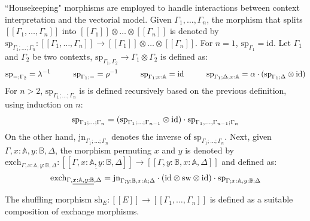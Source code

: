 ``Housekeeping" morphisms are employed to handle interactions between context interpretation and the vectorial model. Given $\Gamma_{1}, \ldots, \Gamma_{n}$, the morphism that splits $[\![\Gamma_{1}, \ldots, \Gamma_{n}]\!]$ into $[\![\Gamma_{1}]\!] \otimes \ldots \otimes [\![\Gamma_{n}]\!]  $ is denoted by $\text{sp}_{\Gamma_1;\ldots;\Gamma_n}: [\![\Gamma_{1}, \ldots, \Gamma_{n}]\!] \xrightarrow{} [\![\Gamma_{1}]\!] \otimes \ldots \otimes [\![\Gamma_{n}]\!] $. For $n=1$, $\text{sp}_{\Gamma_1} = \text{id}$.
Let $\Gamma_1$ and $\Gamma_2$ be two contexts, $\text{sp}_{\Gamma_1, \Gamma_2} \rightarrow \Gamma_1\otimes \Gamma_2$ is defined as:
\begin{equation*}
  \text{sp}_{-; \Gamma_2} = \lambda^{-1} \hspace{1cm} \text{sp}_{\Gamma_1; -} = \rho^{-1} \hspace{1cm} \text{sp}_{\Gamma_1;x:\mathbb{A}} = \mathrm{id} \hspace{1cm} \text{sp}_{\Gamma_1; \Delta, x: \mathbb{A}} = \alpha \cdot (\text{sp}_{\Gamma_1; \Delta} \otimes \mathrm{id})
\end{equation*}
For $n>2$, $\text{sp}_{\Gamma_1;\ldots;\Gamma_n}$ is is defined recursively based on the previous definition, using induction on $n$:
\begin{equation*}
  \text{sp}_{\Gamma_1;\ldots;\Gamma_n} = (\text{sp}_{\Gamma_1;\ldots;\Gamma_{n-1}} \otimes \mathrm{id} )\cdot \text{sp}_{\Gamma_1, \ldots, \Gamma_{n-1} ;\Gamma_n}
\end{equation*}
On the other hand, $\text{jn}_{\Gamma_1;\ldots;\Gamma_n}$ denotes the inverse of $\text{sp}_{\Gamma_1;\ldots;\Gamma_n}$. Next, given $\Gamma, x : \mathbb{A}, y : \mathbb{B},\Delta$, the morphism permuting $x$ and $y$ is denoted by $\text{exch}_{\Gamma, x : \mathbb{A}, y : \mathbb{B},\Delta}: [\![\Gamma,\underline{ x : \mathbb{A}, y : \mathbb{B}},\Delta]\!] \xrightarrow{} [\![\Gamma, y : \mathbb{B}, x : \mathbb{A}, \Delta]\!] $ and defined as:
\begin{equation*}
  \text{exch}_{\Gamma, \underline{ x : \mathbb{A}, y : \mathbb{B}},\Delta} = \text{jn}_{\Gamma; y:\mathbb{B}, x:\mathbb{A};\Delta} \cdot (\mathrm{id} \otimes \text{sw} \otimes \mathrm{id} ) \cdot \text{sp}_{\Gamma; x:\mathbb{A}, y:\mathbb{B};\Delta}
\end{equation*} 


The shuffling morphism $\text{sh}_{E}: [\![E]\!] \xrightarrow{} [\![\Gamma_1, \ldots, \Gamma_n ]\!]$ is defined as a suitable composition of exchange morphisms.


